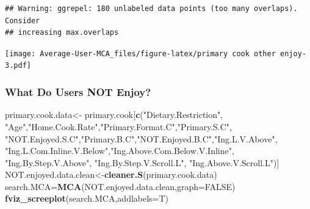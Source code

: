 \documentclass[
]{article}
\newenvironment{Shaded}{\begin{snugshade}}{\end{snugshade}}
\newcommand{\DataTypeTok}[1]{\textcolor[rgb]{0.13,0.29,0.53}{#1}}
\newcommand{\KeywordTok}[1]{\textcolor[rgb]{0.13,0.29,0.53}{\textbf{#1}}}
\newcommand{\NormalTok}[1]{#1}
\newcommand{\OtherTok}[1]{\textcolor[rgb]{0.56,0.35,0.01}{#1}}
\newcommand{\StringTok}[1]{\textcolor[rgb]{0.31,0.60,0.02}{#1}}
\begin{document}
\begin{Shaded}
\end{Shaded}

\begin{verbatim}
## Warning: ggrepel: 180 unlabeled data points (too many overlaps). Consider
## increasing max.overlaps
\end{verbatim}

\texttt{[image: Average-User-MCA\_files/figure-latex/primary cook other enjoy-3.pdf]}

\hypertarget{what-do-users-not-enjoy-3}{%
\subsubsection{What Do Users NOT
Enjoy?}\label{what-do-users-not-enjoy-3}}

\begin{Shaded}
\begin{Highlighting}[]
\NormalTok{primary.cook.data<-}\StringTok{ }\NormalTok{primary.cook[}\KeywordTok{c}\NormalTok{(}\StringTok{"Dietary.Restriction"}\NormalTok{, }\StringTok{"Age"}\NormalTok{,}\StringTok{"Home.Cook.Rate"}\NormalTok{,}\StringTok{"Primary.Format.C"}\NormalTok{,}\StringTok{"Primary.S.C"}\NormalTok{,}
            \StringTok{"NOT.Enjoyed.S.C"}\NormalTok{,}\StringTok{"Primary.B.C"}\NormalTok{,}\StringTok{"NOT.Enjoyed.B.C"}\NormalTok{,}\StringTok{"Ing.L.V.Above"}\NormalTok{,}
            \StringTok{"Ing.L.Com.Inline.V.Below"}\NormalTok{,}\StringTok{"Ing.Above.Com.Below.V.Inline"}\NormalTok{,  }\StringTok{"Ing.By.Step.V.Above"}\NormalTok{,  }\StringTok{"Ing.By.Step.V.Scroll.L"}\NormalTok{,}
            \StringTok{"Ing.Above.V.Scroll.L"}\NormalTok{)]}
\NormalTok{NOT.enjoyed.data.clean<-}\KeywordTok{cleaner.S}\NormalTok{(primary.cook.data)}
\NormalTok{search.MCA=}\KeywordTok{MCA}\NormalTok{(NOT.enjoyed.data.clean,}\DataTypeTok{graph=}\OtherTok{FALSE}\NormalTok{)}
\KeywordTok{fviz_screeplot}\NormalTok{(search.MCA,}\DataTypeTok{addlabels=}\NormalTok{T)}
\end{Highlighting}
\end{Shaded}
\end{document}
